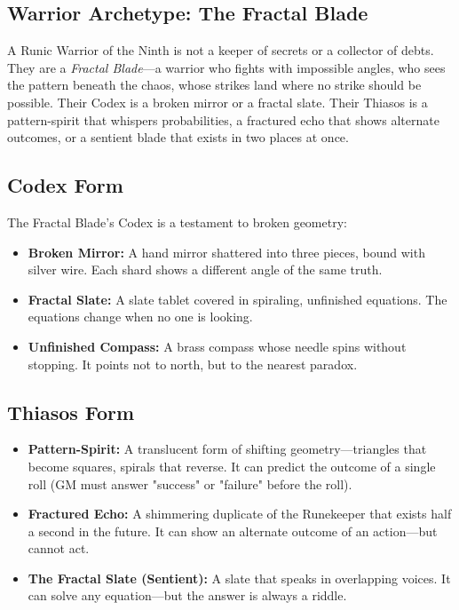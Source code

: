 \subsection{Warrior Archetype: The Fractal Blade}

A Runic Warrior of the Ninth is not a keeper of secrets or a collector of debts. They are a \textit{Fractal Blade}—a warrior who fights with impossible angles, who sees the pattern beneath the chaos, whose strikes land where no strike should be possible. Their Codex is a broken mirror or a fractal slate. Their Thiasos is a pattern-spirit that whispers probabilities, a fractured echo that shows alternate outcomes, or a sentient blade that exists in two places at once.

\subsection{Codex Form}

The Fractal Blade's Codex is a testament to broken geometry:

\begin{itemize}
\item \textbf{Broken Mirror:} A hand mirror shattered into three pieces, bound with silver wire. Each shard shows a different angle of the same truth.
\item \textbf{Fractal Slate:} A slate tablet covered in spiraling, unfinished equations. The equations change when no one is looking.
\item \textbf{Unfinished Compass:} A brass compass whose needle spins without stopping. It points not to north, but to the nearest paradox.
\end{itemize}

\subsection{Thiasos Form}

\begin{itemize}
\item \textbf{Pattern-Spirit:} A translucent form of shifting geometry—triangles that become squares, spirals that reverse. It can predict the outcome of a single roll (GM must answer "success" or "failure" before the roll).
\item \textbf{Fractured Echo:} A shimmering duplicate of the Runekeeper that exists half a second in the future. It can show an alternate outcome of an action—but cannot act.
\item \textbf{The Fractal Slate (Sentient):} A slate that speaks in overlapping voices. It can solve any equation—but the answer is always a riddle.
\end{itemize}

